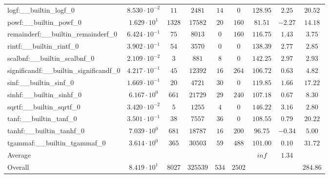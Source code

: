 \begin{tabular}{|l|c|c|c|c|c|c|c|c|}
logf:\_\_builtin\_logf\_0                 & $ 8.530 \cdot 10^{-2} $ & $ 11     $ & $ 2481   $ & $ 14  $ & $ 0    $ & $ 128.95      $ & $ 2.25    $ & $ 20.52   $ \\
powf:\_\_builtin\_powf\_0                 & $ 1.629 \cdot 10^{1}  $ & $ 1328   $ & $ 17582  $ & $ 20  $ & $ 160  $ & $ 81.51       $ & $ -2.27   $ & $ 14.18   $ \\
remainderf:\_\_builtin\_remainderf\_0     & $ 6.424 \cdot 10^{-1} $ & $ 75     $ & $ 8013   $ & $ 0   $ & $ 160  $ & $ 116.75      $ & $ 1.43    $ & $ 3.75    $ \\
rintf:\_\_builtin\_rintf\_0               & $ 3.902 \cdot 10^{-1} $ & $ 54     $ & $ 3570   $ & $ 0   $ & $ 0    $ & $ 138.39      $ & $ 2.77    $ & $ 2.85    $ \\
scalbnf:\_\_builtin\_scalbnf\_0           & $ 2.109 \cdot 10^{-2} $ & $ 3      $ & $ 881    $ & $ 8   $ & $ 0    $ & $ 142.25      $ & $ 2.97    $ & $ 2.93    $ \\
significandf:\_\_builtin\_significandf\_0 & $ 4.217 \cdot 10^{-1} $ & $ 45     $ & $ 12392  $ & $ 16  $ & $ 264  $ & $ 106.72      $ & $ 0.63    $ & $ 4.82    $ \\
sinf:\_\_builtin\_sinf\_0                 & $ 1.669 \cdot 10^{-1} $ & $ 20     $ & $ 4721   $ & $ 30  $ & $ 0    $ & $ 119.85      $ & $ 1.66    $ & $ 17.22   $ \\
sinhf:\_\_builtin\_sinhf\_0               & $ 6.167 \cdot 10^{0}  $ & $ 661    $ & $ 21729  $ & $ 29  $ & $ 240  $ & $ 107.18      $ & $ 0.67    $ & $ 8.30    $ \\
sqrtf:\_\_builtin\_sqrtf\_0               & $ 3.420 \cdot 10^{-2} $ & $ 5      $ & $ 1255   $ & $ 4   $ & $ 0    $ & $ 146.22      $ & $ 3.16    $ & $ 2.80    $ \\
tanf:\_\_builtin\_tanf\_0                 & $ 3.501 \cdot 10^{-1} $ & $ 38     $ & $ 7557   $ & $ 36  $ & $ 0    $ & $ 108.55      $ & $ 0.79    $ & $ 20.22   $ \\
tanhf:\_\_builtin\_tanhf\_0               & $ 7.039 \cdot 10^{0}  $ & $ 681    $ & $ 18787  $ & $ 16  $ & $ 200  $ & $ 96.75       $ & $ -0.34   $ & $ 5.00    $ \\
tgammaf:\_\_builtin\_tgammaf\_0           & $ 3.614 \cdot 10^{0}  $ & $ 365    $ & $ 30503  $ & $ 59  $ & $ 488  $ & $ 101.00      $ & $ 0.10    $ & $ 31.72   $ \\
\hline
Average                                   & $                     $ & $        $ & $        $ & $     $ & $      $ & $ inf         $ & $ 1.34    $ & $         $ \\
\hline
Overall                                   & $ 8.419 \cdot 10^{1}  $ & $ 8027   $ & $ 325539 $ & $ 534 $ & $ 2502 $ & $             $ & $         $ & $ 284.86  $ \\
\hline
\end{tabular}

